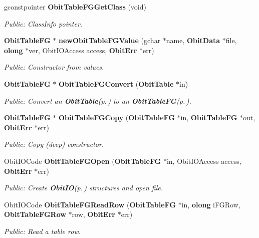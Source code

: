 \begin{CompactItemize}
gconstpointer {\bf Obit\-Table\-FGGet\-Class} (void)
\begin{CompactList}\small\item\em Public: Class\-Info pointer. \item\end{CompactList}\item 
{\bf Obit\-Table\-FG} $\ast$ {\bf new\-Obit\-Table\-FGValue} (gchar $\ast$name, {\bf Obit\-Data} $\ast$file, {\bf olong} $\ast$ver, Obit\-IOAccess access, {\bf Obit\-Err} $\ast$err)
\begin{CompactList}\small\item\em Public: Constructor from values. \item\end{CompactList}\item 
{\bf Obit\-Table\-FG} $\ast$ {\bf Obit\-Table\-FGConvert} ({\bf Obit\-Table} $\ast$in)
\begin{CompactList}\small\item\em Public: Convert an {\bf Obit\-Table}{\rm (p.\,\pageref{structObitTable})} to an {\bf Obit\-Table\-FG}{\rm (p.\,\pageref{structObitTableFG})}. \item\end{CompactList}\item 
{\bf Obit\-Table\-FG} $\ast$ {\bf Obit\-Table\-FGCopy} ({\bf Obit\-Table\-FG} $\ast$in, {\bf Obit\-Table\-FG} $\ast$out, {\bf Obit\-Err} $\ast$err)
\begin{CompactList}\small\item\em Public: Copy (deep) constructor. \item\end{CompactList}\item 
Obit\-IOCode {\bf Obit\-Table\-FGOpen} ({\bf Obit\-Table\-FG} $\ast$in, Obit\-IOAccess access, {\bf Obit\-Err} $\ast$err)
\begin{CompactList}\small\item\em Public: Create {\bf Obit\-IO}{\rm (p.\,\pageref{structObitIO})} structures and open file. \item\end{CompactList}\item 
Obit\-IOCode {\bf Obit\-Table\-FGRead\-Row} ({\bf Obit\-Table\-FG} $\ast$in, {\bf olong} i\-FGRow, {\bf Obit\-Table\-FGRow} $\ast$row, {\bf Obit\-Err} $\ast$err)
\begin{CompactList}\small\item\em Public: Read a table row. \item\end{CompactList}\item 

\end{CompactItemize}

